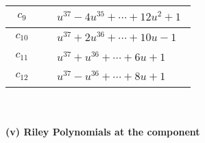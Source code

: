 \documentclass[1p]{elsarticle_modified}
\theoremstyle{definition}
\begin{document}
\begin{tabular}{m{50pt}|m{274pt}}
\hline $$\begin{aligned}c_{9}\end{aligned}$$&$\begin{aligned}
&u^{37}-4 u^{35}+\cdots+12 u^2+1
\end{aligned}$\\
\hline $$\begin{aligned}c_{10}\end{aligned}$$&$\begin{aligned}
&u^{37}+2 u^{36}+\cdots+10 u-1
\end{aligned}$\\
\hline $$\begin{aligned}c_{11}\end{aligned}$$&$\begin{aligned}
&u^{37}+u^{36}+\cdots+6 u+1
\end{aligned}$\\
\hline $$\begin{aligned}c_{12}\end{aligned}$$&$\begin{aligned}
&u^{37}- u^{36}+\cdots+8 u+1
\end{aligned}$\\
\hline
\end{tabular}\\~\\
\newpage\renewcommand{\arraystretch}{1}
\flushleft \textbf{(v) Riley Polynomials at the component}\newline \\
\end{document}
